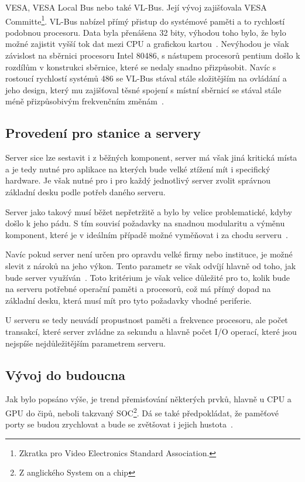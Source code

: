 VESA, VESA Local Bus nebo také VL-Bus. Její vývoj zajišťovala VESA Committe\footnote{Zkratka
pro Video Electronics Standard Association.}. VL-Bus nabízel přímý přistup
do systémové paměti a to rychlostí podobnou procesoru. Data byla přenášena 32 bity,
výhodou toho bylo, že bylo možné zajistit vyšší tok dat mezi CPU a grafickou
kartou~\cite{ref:mb:karlstechnology}. Nevýhodou je však závislost na sběrnici
procesoru Intel 80486, s nástupem procesorů pentium došlo k rozdílům v konstrukci
sběrnice, které se nedaly snadno přizpůsobit. Navíc s rostoucí rychlostí systémů
486 se VL-Bus stával stále složitějším na ovládání a jeho design, který mu zajišťoval těsné spojení s místní sběrnicí se stával stále méně přizpůsobivým frekvenčním
změnám~\cite{ref:mb:atarimagazines}.

\subsection{Provedení pro stanice a servery}
Server sice lze sestavit i z běžných komponent, server má však jiná kritická místa
a je tedy nutné pro aplikace na kterých bude velké ztížení mít i specifický hardware.
Je však nutné pro i pro každý jednotlivý server zvolit správnou základní desku
podle potřeb daného serveru.

Server jako takový musí běžet nepřetržitě a bylo by velice problematické,
kdyby došlo k jeho pádu. S tím souvisí požadavky na snadnou modularitu a výměnu
komponent, které je v ideálním případě možné vyměňovat i za chodu
serveru~\cite{ref:mb:neweggbusiness}.

Navíc pokud server není určen pro opravdu velké firmy nebo instituce, je možné
slevit z nároků na jeho výkon. Tento parametr se však odvíjí hlavně od toho,
jak bude server využíván~\cite{ref:mb:neweggbusiness}.
Toto kritérium je však velice důležité pro to, kolik bude na serveru potřebné
operační paměti a procesorů, což má přímý dopad na základní desku, která musí
mít pro tyto požadavky vhodné periferie.

U serveru se tedy neuvádí propustnost
paměti a frekvence procesoru, ale počet transakcí, které server zvládne za sekundu
a hlavně počet I/O operací, které jsou nejspíše nejdůležitějším parametrem
serveru.

\subsection{Vývoj do budoucna}
Jak bylo popsáno výše, je trend přemisťování některých prvků, hlavně u CPU a GPU
do čipů, neboli takzvaný SOC\footnote{Z anglického System on a chip}. Dá se také
předpokládat, že paměťové porty se budou zrychlovat a bude se zvětšovat i
jejich hustota~\cite{ref:mb:embedded}.

